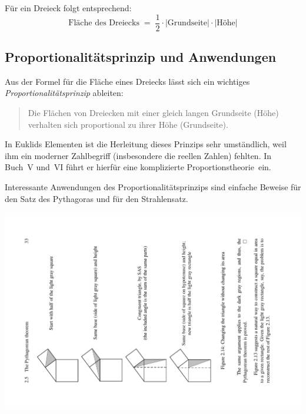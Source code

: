 \bigskip









Für ein Dreieck folgt entsprechend:
$$
\mbox{Fläche des Dreiecks} \; = \; \frac{1}{2} \cdot |\mbox{Grundseite}| \cdot |\mbox{Höhe}|
$$




\subsection*{Proportionalitätsprinzip und Anwendungen}

Aus der Formel für die Fläche eines Dreiecks lässt sich ein wichtiges
{\em Proportionalitätsprinzip} ableiten: 


\begin{quote}
Die Flächen von Dreiecken mit einer gleich
langen Grundseite (Höhe) verhalten sich proportional zu ihrer Höhe (Grundseite).
\end{quote}

In Euklids Elementen ist die Herleitung dieses Prinzips sehr
umständlich, weil ihm ein moderner Zahlbegriff (insbesondere die
reellen Zahlen) fehlten. In Buch~V und~VI führt er hierfür eine
komplizierte \glqq Proportionstheorie\grqq\ ein.


Interessante Anwendungen des Proportionalitätsprinzips 
sind einfache Beweise für den Satz des Pythagoras und für den
Strahlensatz. %




\bigskip

\centerline{\includegraphics[width=16cm]{BILDER/BildSatzDesPythagoras2.pdf}}



